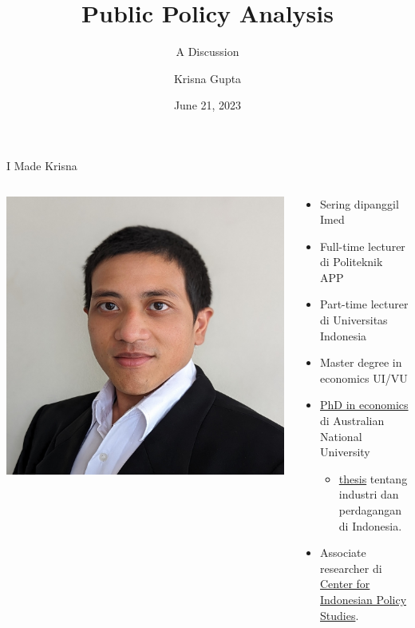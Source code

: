 \documentclass[
  ignorenonframetext,
]{beamer}
\title{Public Policy Analysis}
\subtitle{A Discussion}
\author{Krisna Gupta}
\date{June 21, 2023}
\institute{Center for Indonesian Policy Studies}
\providecommand{\tightlist}{%
  \setlength{\itemsep}{0pt}\setlength{\parskip}{0pt}}\usepackage{longtable,booktabs,array}
\begin{document}
\frame{\titlepage}
\ifdefined\Shaded\renewenvironment{Shaded}{\begin{tcolorbox}[frame hidden, interior hidden, sharp corners, borderline west={3pt}{0pt}{shadecolor}, boxrule=0pt, breakable, enhanced]}{\end{tcolorbox}}\fi

\begin{frame}{I Made Krisna}
\protect\hypertarget{i-made-krisna}{}
\begin{columns}[T]
\begin{column}{0.4\textwidth}
\includegraphics{cips_files/mediabag/foto_krisna.jpg}
\end{column}

\begin{column}{0.6\textwidth}
\begin{itemize}
\item
  Sering dipanggil Imed
\item
  Full-time lecturer di Politeknik APP
\item
  Part-time lecturer di Universitas Indonesia
\item
  Master degree in economics UI/VU
\item
  \href{https://crawford.anu.edu.au/people/phd/krisna-gupta}{PhD in
  economics} di Australian National University

  \begin{itemize}
  \tightlist
  \item
    \href{https://openresearch-repository.anu.edu.au/handle/1885/270149}{thesis}
    tentang industri dan perdagangan di Indonesia.
  \end{itemize}
\item
  Associate researcher di
  \href{https://www.cips-indonesia.org/about?lang=id}{Center for
  Indonesian Policy Studies}.


\end{itemize}
\end{column}
\end{columns}
\end{frame}
\end{document}
